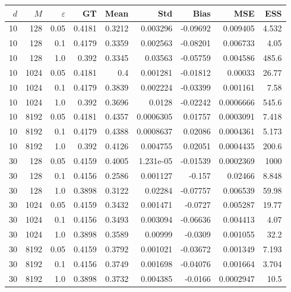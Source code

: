 \documentclass{article}
\begin{document}
\begin{table}[htbp]
\centering
\scriptsize
\setlength{\tabcolsep}{4pt}
\begin{tabular}{rrr|rrrrrr}
\toprule
$d$ & $M$ & $\varepsilon$ & GT & Mean & Std & Bias & MSE & ESS \\
\midrule
\rowcolor{yellow!40}10 & 128 & 0.05 & 0.4181 & 0.3212 & 0.003296 & -0.09692 & 0.009405 & 4.532 \\
\rowcolor{yellow!40}10 & 128 & 0.1 & 0.4179 & 0.3359 & 0.002563 & -0.08201 & 0.006733 & 4.05 \\
\rowcolor{yellow!40}10 & 128 & 1.0 & 0.392 & 0.3345 & 0.03563 & -0.05759 & 0.004586 & 485.6 \\
\midrule
10 & 1024 & 0.05 & 0.4181 & 0.4 & 0.001281 & -0.01812 & 0.00033 & 26.77 \\
10 & 1024 & 0.1 & 0.4179 & 0.3839 & 0.002224 & -0.03399 & 0.001161 & 7.58 \\
10 & 1024 & 1.0 & 0.392 & 0.3696 & 0.0128 & -0.02242 & 0.0006666 & 545.6 \\
\midrule
10 & 8192 & 0.05 & 0.4181 & 0.4357 & 0.0006305 & 0.01757 & 0.0003091 & 7.418 \\
10 & 8192 & 0.1 & 0.4179 & 0.4388 & 0.0008637 & 0.02086 & 0.0004361 & 5.173 \\
10 & 8192 & 1.0 & 0.392 & 0.4126 & 0.004755 & 0.02051 & 0.0004435 & 200.6 \\
\midrule
30 & 128 & 0.05 & 0.4159 & 0.4005 & 1.231e-05 & -0.01539 & 0.0002369 & 1000 \\
\rowcolor{orange!50}30 & 128 & 0.1 & 0.4156 & 0.2586 & 0.001127 & -0.157 & 0.02466 & 8.848 \\
\rowcolor{yellow!40}30 & 128 & 1.0 & 0.3898 & 0.3122 & 0.02284 & -0.07757 & 0.006539 & 59.98 \\
\midrule
\rowcolor{yellow!40}30 & 1024 & 0.05 & 0.4159 & 0.3432 & 0.001471 & -0.0727 & 0.005287 & 19.77 \\
\rowcolor{yellow!40}30 & 1024 & 0.1 & 0.4156 & 0.3493 & 0.003094 & -0.06636 & 0.004413 & 4.07 \\
30 & 1024 & 1.0 & 0.3898 & 0.3589 & 0.00999 & -0.0309 & 0.001055 & 32.2 \\
\midrule
30 & 8192 & 0.05 & 0.4159 & 0.3792 & 0.001021 & -0.03672 & 0.001349 & 7.193 \\
30 & 8192 & 0.1 & 0.4156 & 0.3749 & 0.001698 & -0.04076 & 0.001664 & 3.704 \\
30 & 8192 & 1.0 & 0.3898 & 0.3732 & 0.004385 & -0.0166 & 0.0002947 & 10.5 \\
\midrule

\end{tabular}
\end{table}
\end{document}
